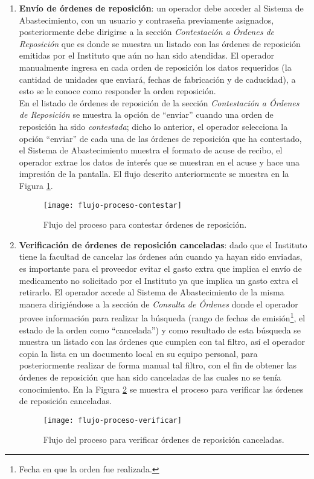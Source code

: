 \begin{enumerate}
\item \textbf{Envío de órdenes de reposición}: un operador debe acceder al Sistema de Abastecimiento, con un usuario y contraseña previamente asignados, posteriormente debe dirigirse a la sección \textit{Contestación a Órdenes de Reposición} que es donde se muestra un listado con las órdenes de reposición emitidas por el Instituto que aún no han sido atendidas. El operador manualmente ingresa en cada orden de reposición los datos requeridos (la cantidad de unidades que enviará, fechas de fabricación y de caducidad), a esto se le conoce como responder la orden reposición.\\
En el listado de órdenes de reposición de la sección \textit{Contestación a Órdenes de Reposición} se muestra la opción de ``enviar'' cuando una orden de reposición ha sido \textit{contestada}; dicho lo anterior, el operador selecciona la opción ``enviar'' de cada una de las órdenes de reposición que ha contestado, el Sistema de Abastecimiento muestra el formato de acuse de recibo, el operador extrae los datos de interés que se muestran en el acuse y hace una impresión de la pantalla. El flujo descrito anteriormente se muestra en la Figura \ref{fig:flow-proc-contestar}.

\begin{figure}[h]
\centering
\texttt{[image: flujo-proceso-contestar]} 
\caption{Flujo del proceso para contestar órdenes de reposición.}
\label{fig:flow-proc-contestar}
\end{figure}

\item \textbf{Verificación de órdenes de reposición canceladas}: dado que el Instituto tiene la facultad de cancelar las órdenes aún cuando ya hayan sido enviadas, es importante para el proveedor evitar el gasto extra que implica el envío de medicamento no solicitado por el Instituto ya que implica un gasto extra el retirarlo. El operador accede al Sistema de Abastecimiento de la misma manera dirigiéndose a la sección de \textit{Consulta de Órdenes} donde el operador provee información para realizar la búsqueda (rango de fechas de emisión\footnote{Fecha en que la orden fue realizada.}, el estado de la orden como ``cancelada'') y como resultado de esta búsqueda se muestra un listado con las órdenes que cumplen con tal filtro, así el operador copia la lista en un documento local en su equipo personal, para posteriormente realizar de forma manual tal filtro, con el fin de obtener las órdenes de reposición que han sido canceladas de las cuales no se tenía conocimiento. En la Figura \ref{fig:flow-proc-verificar} se muestra el proceso para verificar las órdenes de reposición canceladas.
\begin{figure}[h]
\centering
\texttt{[image: flujo-proceso-verificar]} 
\caption{Flujo del proceso para verificar órdenes de reposición canceladas.}
\label{fig:flow-proc-verificar}
\end{figure}
\end{enumerate}

